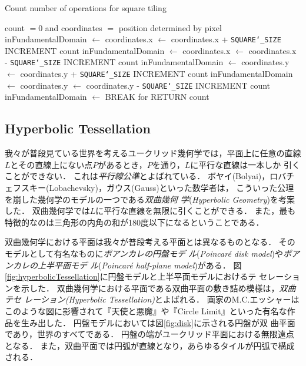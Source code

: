 \begin{algorithm}
 \begin{algorithmic}
  \caption{Count number of operations for square tiling}
  \label{alg:rectTile}
  \REQUIRE count $= 0$ and coordinates $=$ position determined by pixel
  \STATE inFundamentalDomain $\leftarrow$ \TRUE
  \STATE coordinates.x $\leftarrow$ coordinates.x + \texttt{SQUARE\char`_SIZE}
  \STATE INCREMENT count
  \STATE inFundamentalDomain $\leftarrow$ \FALSE
  \ENDIF
  \STATE coordinates.x $\leftarrow$ coordinates.x - \texttt{SQUARE\char`_SIZE}
  \STATE INCREMENT count
  \STATE inFundamentalDomain $\leftarrow$ \FALSE
  \ENDIF
  \STATE coordinates.y $\leftarrow$ coordinates.y + \texttt{SQUARE\char`_SIZE}
  \STATE INCREMENT count
  \STATE inFundamentalDomain $\leftarrow$ \FALSE
  \ENDIF
  \STATE coordinates.y $\leftarrow$ coordinates.y - \texttt{SQUARE\char`_SIZE}
  \STATE INCREMENT count
  \STATE inFundamentalDomain $\leftarrow$ \FALSE
  \ENDIF
  \STATE BREAK for
  \ENDIF
  \ENDFOR
  \STATE RETURN count
 \end{algorithmic}
\end{algorithm}

\subsection{Hyperbolic Tessellation}

我々が普段見ている世界を考えるユークリッド幾何学では，平面上に任意の直線
$L$とその直線上にない点$P$があるとき，$P$を通り，$L$に平行な直線は一本しか
引くことができない．
これは\emph{平行線公準}とよばれている．
ボヤイ(Bolyai)，ロバチェフスキー(Lobachevsky)，ガウス(Gauss)といった数学者は，
こういった公理を崩した幾何学のモデルの一つである\emph{双曲幾何
学}(\textit{Hyperbolic Geometry})を考案した．
双曲幾何学では$L$に平行な直線を無限に引くことができる．
また，最も特徴的なのは三角形の内角の和が180度以下になるということである．

双曲幾何学における平面は我々が普段考える平面とは異なるものとなる．
そのモデルとして有名なものに\emph{ポアンカレの円盤モデ
ル}(\textit{Poincar\'e disk model})や\emph{ポアンカレの上半平面モデ
ル}(\textit{Poincar\'e half-plane model})がある．
図\ref{fig:hyperbolicTessellation}に円盤モデルと上半平面モデルにおけるテ
セレーションを示した．
双曲幾何学における平面である双曲平面の敷き詰め模様は，\emph{双曲テセ
レーション}{\it (Hyperbolic Tessellation)}とよばれる．
画家のM.C.エッシャーはこのような図に影響されて『天使と悪魔』や『Circle
Limit』といった有名な作品を生み出した．
円盤モデルにおいては図\ref{fig:disk}に示される円盤が双
曲平面であり，世界のすべてである．
円盤の端がユークリッド平面における無限遠点となる．
また，双曲平面では円弧が直線となり，あらゆるタイルが円弧で構成される．

